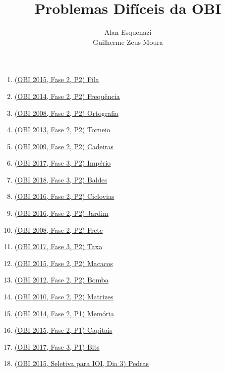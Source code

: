 \documentclass[10pt,a4paper]{article}
\title{Problemas Difíceis da OBI}
\date{}
\author{Alan Esquenazi \\ Guilherme Zeus Moura}
\begin{document}
	\maketitle

	\begin{enumerate}[label = --]
		\item \href{https://olimpiada.ic.unicamp.br/pratique/p2/2015/f2/fila/}{(OBI 2015, Fase 2, P2) Fila}
		\item \href{https://olimpiada.ic.unicamp.br/pratique/p2/2014/f2/frequencia/
}{(OBI 2014, Fase 2, P2) Frequência}
		\item \href{https://olimpiada.ic.unicamp.br/pratique/p2/2008/f2/ortografia/}{(OBI 2008, Fase 2, P2) Ortografia}
		\item \href{https://olimpiada.ic.unicamp.br/pratique/p2/2013/f2/torneio/}{(OBI 2013, Fase 2, P2) Torneio}
		\item \href{https://olimpiada.ic.unicamp.br/pratique/p2/2009/f2/cadeiras/}{(OBI 2009, Fase 2, P2) Cadeiras}
		\item \href{https://olimpiada.ic.unicamp.br/pratique/p2/2017/f3/imperio/}{(OBI 2017, Fase 3, P2) Império}
		\item \href{https://olimpiada.ic.unicamp.br/pratique/p2/2018/f3/baldes/}{(OBI 2018, Fase 3, P2) Baldes}
		\item \href{https://olimpiada.ic.unicamp.br/pratique/p2/2016/f2/ciclovias/}{(OBI 2016, Fase 2, P2) Ciclovias}
		\item \href{https://olimpiada.ic.unicamp.br/pratique/p2/2016/f2/jardim/}{(OBI 2016, Fase 2, P2) Jardim}
		\item \href{https://olimpiada.ic.unicamp.br/pratique/p2/2008/f2/frete/}{(OBI 2008, Fase 2, P2) Frete}
		\item \href{https://olimpiada.ic.unicamp.br/pratique/p2/2017/f3/taxa/}{(OBI 2017, Fase 3, P2) Taxa}
		\item \href{https://olimpiada.ic.unicamp.br/pratique/p2/2015/f2/macacos/}{(OBI 2015, Fase 2, P2) Macacos}
		\item \href{https://olimpiada.ic.unicamp.br/pratique/p2/2012/f2/bomba/}{(OBI 2012, Fase 2, P2) Bomba}
		\item \href{https://olimpiada.ic.unicamp.br/pratique/p2/2010/f2/matrizes/}{(OBI 2010, Fase 2, P2) Matrizes}
		\item \href{https://olimpiada.ic.unicamp.br/pratique/p1/2014/f2/memoria/}{(OBI 2014, Fase 2, P1) Memória}
		\item \href{https://olimpiada.ic.unicamp.br/pratique/p1/2015/f2/capitais/}{(OBI 2015, Fase 2, P1) Capitais}
		\item \href{https://olimpiada.ic.unicamp.br/pratique/p1/2017/f3/bits/}{(OBI 2017, Fase 3, P1) Bits}
		\item \href{https://neps.academy/problem/351}{(OBI 2015, Seletiva para IOI, Dia 3) Pedras}
 
	\end{enumerate}
\end{document}
